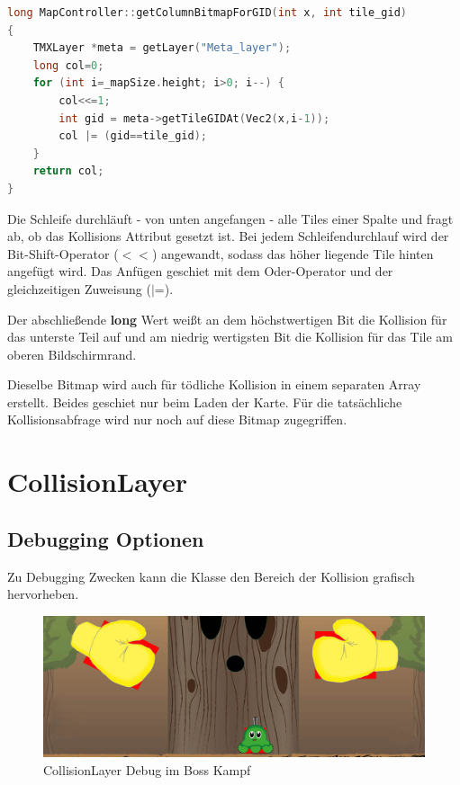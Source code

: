 \begin{lstlisting}[label=lst:collision_detection,
				   language=C++,
				   firstnumber=271,
				   caption=Collision Column abfragen ( MapController.cpp )]
long MapController::getColumnBitmapForGID(int x, int tile_gid)
{
	TMXLayer *meta = getLayer("Meta_layer");
	long col=0;
	for (int i=_mapSize.height; i>0; i--) {
		col<<=1;
		int gid = meta->getTileGIDAt(Vec2(x,i-1));
		col |= (gid==tile_gid);
	}
	return col;
}
\end{lstlisting}

Die Schleife durchläuft - von unten angefangen - alle Tiles einer Spalte und fragt ab, ob das Kollisions Attribut gesetzt ist. Bei jedem Schleifendurchlauf wird der Bit-Shift-Operator ($<<$) angewandt, sodass das höher liegende Tile hinten angefügt wird. Das Anfügen geschiet mit dem Oder-Operator und der gleichzeitigen Zuweisung ($|$=).

Der abschließende \textbf{long} Wert weißt an dem höchstwertigen Bit die Kollision für das unterste Teil auf und am niedrig wertigsten Bit die Kollision für das Tile am oberen Bildschirmrand.

Dieselbe Bitmap wird auch für tödliche Kollision in einem separaten Array erstellt. Beides geschiet nur beim Laden der Karte. Für die tatsächliche Kollisionsabfrage wird nur noch auf diese Bitmap zugegriffen.



\section{CollisionLayer}\label{sec:4_CollisionLayer}
\subsection{Debugging Optionen}\label{sec:CollisionLayerDebug}

Zu Debugging Zwecken kann die  Klasse den Bereich der Kollision grafisch hervorheben.

\begin{figure}[H]
  \centering
  \includegraphics[width=\textwidth - 50pt]{resources/CollisionLayer_BossKampf.jpg}
  \caption{CollisionLayer Debug im Boss Kampf}
  \label{fig:collision_debug_boss} 
\end{figure}

